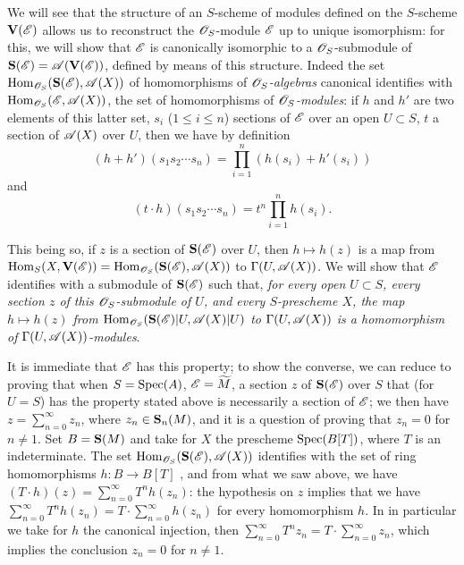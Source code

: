 \begin{env}[1.7.14]
\label{2.1.7.14}
We will see that the structure of an $S$-scheme of modules defined on the $S$-scheme $\mathbf{V}(\mathscr{E})$ allows us to reconstruct the $\mathscr{O}_S$-module $\mathscr{E}$ up to unique isomorphism: for this, we will show that $\mathscr{E}$ is canonically isomorphic to a $\mathscr{O}_S$-submodule of $\mathbf{S}(\mathscr{E})=\mathscr{A}(\mathbf{V}(\mathscr{E}))$, defined by means of this structure.
Indeed  the set $\operatorname{Hom}_{\mathscr{O}_S}(\mathbf{S}(\mathscr{E}),\mathscr{A}(X))$ of homomorphisms of \emph{$\mathscr{O}_S$-algebras} canonical identifies with $\operatorname{Hom}_{\mathscr{O}_S}(\mathscr{E},\mathscr{A}(X))$, the set of homomorphisms of \emph{$\mathscr{O}_S$-modules}: if $h$ and $h'$ are two elements of this latter set, $s_i$ ($1\leq i\leq n$) sections of $\mathscr{E}$ over an open $U\subset S$, $t$ a section of $\mathscr{A}(X)$ over $U$, then we have by definition
\[
  (h+h')(s_1 s_2\cdots s_n)=\prod_{i=1}^n(h(s_i)+h'(s_i))
\]
and
\[
  (t\cdot h)(s_1 s_2\cdots s_n)=t^n\prod_{i=1}^n h(s_i).
\]

This being so, if $z$ is a section of $\mathbf{S}(\mathscr{E})$ over $U$, then $h\mapsto h(z)$ is a map from $\operatorname{Hom}_S(X,\mathbf{V}(\mathscr{E}))=\operatorname{Hom}_{\mathscr{O}_S}(\mathbf{S}(\mathscr{E}),\mathscr{A}(X))$ to $\Gamma(U,\mathscr{A}(X))$.
We will
show that $\mathscr{E}$ identifies with a submodule of $\mathbf{S}(\mathscr{E})$ such that, \emph{for every open $U\subset S$, every section $z$ of this $\mathscr{O}_S$-submodule of $U$, and every $S$-prescheme $X$, the map $h\mapsto h(z)$ from $\operatorname{Hom}_{\mathscr{O}_S}(\mathbf{S}(\mathscr{E})|U,\mathscr{A}(X)|U)$ to $\Gamma(U,\mathscr{A}(X))$ is a homomorphism of $\Gamma(U,\mathscr{A}(X))$-modules}.

It is immediate that $\mathscr{E}$ has this property; to show the converse, we can reduce to proving that when $S=\operatorname{Spec}(A)$, $\mathscr{E}=\widetilde{M}$, a section $z$ of $\mathbf{S}(\mathscr{E})$ over $S$ that (for $U=S$) has the property stated above is necessarily a section of $\mathscr{E}$; we then have $z=\sum_{n=0}^\infty z_n$, where $z_n\in\mathbf{S}_n(M)$, and it is a question of proving that $z_n=0$ for $n\neq 1$.
Set $B=\mathbf{S}(M)$ and take for $X$ the prescheme $\operatorname{Spec}(B[T])$, where $T$ is an indeterminate.
The set $\operatorname{Hom}_{\mathscr{O}_S}(\mathbf{S}(\mathscr{E}),\mathscr{A}(X))$ identifies with the set of ring homomorphisms $h:B\to B[T]$ , and from what we saw above, we have $(T\cdot h)(z)=\sum_{n=0}^\infty T^n h(z_n)$: the hypothesis on $z$ implies that we have $\sum_{n=0}^\infty T^n h(z_n)=T\cdot\sum_{n=0}^\infty h(z_n)$ for every homomorphism $h$.
In in particular we take for $h$ the canonical injection, then $\sum_{n=0}^\infty T^n z_n=T\cdot\sum_{n=0}^\infty z_n$, which implies the conclusion $z_n=0$ for $n\neq 1$.
\end{env}

